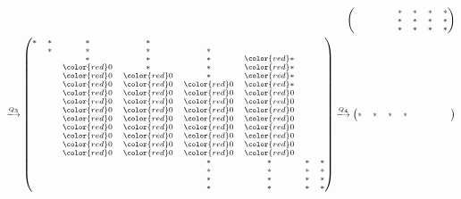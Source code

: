 \begin{exm}
\begin{eqnarray}
\begin{scriptsize}
\begin{aligned}
\begin{pmatrix}
          &  &  &  & \ast& \ast& \ast& \ast\\
          &  &  &  & \ast& \ast& \ast& \ast\\
          &  &  &  & \ast& \ast& \ast& \ast
        \end{pmatrix}\\
        \overset{{Q}_3}{\longrightarrow}
        \begin{pmatrix}
          \ast& \ast& \ast& \ast&  &  &  &\\
              & \ast& \ast& \ast& \ast  &  &  &\\
              & & \ast& \ast& \ast& {\color{red} \ast} &  &\\
              & & {\color{red} 0}& \ast& \ast  & {\color{red} \ast} &  &\\
              & & {\color{red} 0}& {\color{red} 0}& \ast  & {\color{red} \ast} &  &\\
          & & {\color{red} 0}& {\color{red} 0}& {\color{red} 0}& {\color{red} \ast} &  &\\
          & & {\color{red} 0}& {\color{red} 0}& {\color{red} 0}& {\color{red} 0} &  &\\
          & & {\color{red} 0}& {\color{red} 0}& {\color{red} 0}& {\color{red} 0} &  &\\
          &  & {\color{red} 0}& {\color{red} 0}& {\color{red} 0}& {\color{red} 0}&  &\\
          &  & {\color{red} 0}& {\color{red} 0}& {\color{red} 0}& {\color{red} 0}&  &\\
          &  & {\color{red} 0}& {\color{red} 0}& {\color{red} 0}& {\color{red} 0}&  &\\
          &  & {\color{red} 0}& {\color{red} 0}& {\color{red} 0}& {\color{red} 0}&  &\\
          &  & {\color{red} 0}& {\color{red} 0}& {\color{red} 0}& {\color{red} 0}&  &\\
          &  & {\color{red} 0}& {\color{red} 0}& {\color{red} 0}& {\color{red} 0}&  &\\
          &  &  &  & \ast& \ast& \ast& \ast\\
          &  &  &  & \ast& \ast& \ast& \ast\\
          &  &  &  & \ast& \ast& \ast& \ast\\
          &  &  &  & \ast& \ast& \ast& \ast
        \end{pmatrix}
        \overset{{Q}_4}{\longrightarrow}
        \begin{pmatrix}
                   \ast& \ast& \ast& \ast&  &  &  &\\

\end{pmatrix}
\end{aligned}
\end{scriptsize}
\end{eqnarray}
\end{exm}

